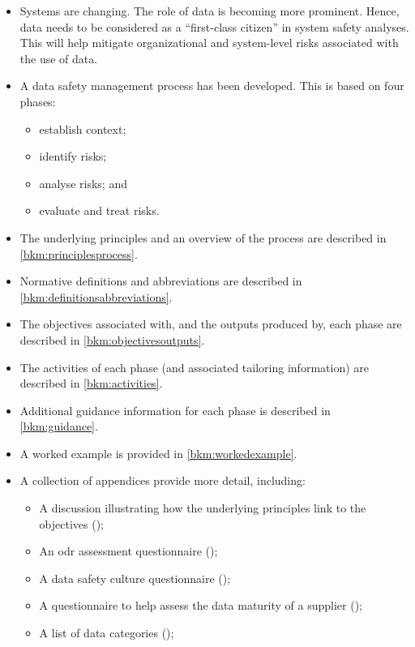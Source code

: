 \begin{itemize}
  \item Systems are changing. The role of data is becoming more prominent. Hence, data needs to be considered as a ``first-class citizen'' in system safety analyses. This will help mitigate organizational and system-level risks associated with the use of data.

  \item A data safety management process has been developed. This is based on four phases:
    \begin{itemize}
      \item establish context;
      \item identify risks;
      \item analyse risks; and
      \item evaluate and \gls{treat} risks.
    \end{itemize}
	\item The underlying principles and an overview of the process are described in \autoref{bkm:principlesprocess}.
	\item Normative definitions and abbreviations are described in \autoref{bkm:definitionsabbreviations}.
	\item The objectives associated with, and the outputs produced by, each phase are described in \autoref{bkm:objectivesoutputs}.
	\item The activities of each phase (and associated \gls{tailoring} \gls{information}) are described in \autoref{bkm:activities}.
	\item Additional guidance \gls{information} for each phase is described in \autoref{bkm:guidance}.
  \item A worked example is provided in \autoref{bkm:workedexample}.
  \item A collection of appendices provide more detail, including:
    \begin{itemize}
      \item A discussion illustrating how the underlying principles link to the objectives (); 
      \item An \gls{odr} assessment questionnaire ();
      \item A data safety culture questionnaire ();
      \item A questionnaire to help assess the data maturity of a supplier ();
      \item A list of data categories ();

\end{itemize}
\end{itemize}
